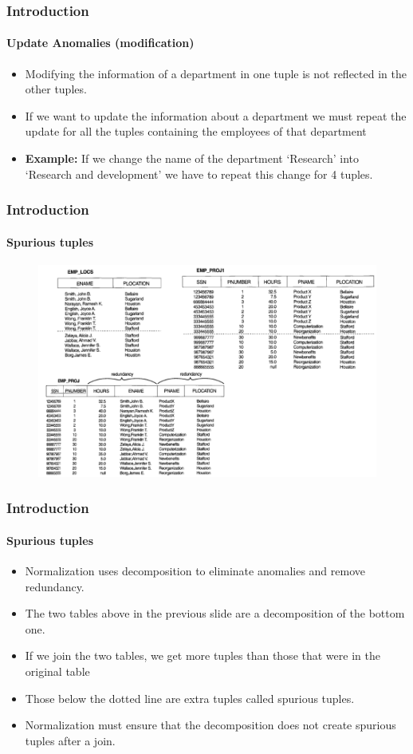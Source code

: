 \documentclass{beamer}
\begin{document}
\begin{frame}
	\frametitle{Introduction}
	\framesubtitle{Update Anomalies (modification)}
	
	\begin{itemize}
		\item Modifying the information of a department in one tuple is not reflected in the other tuples.
		\item If we want to update the information about a department we must repeat the update for all the tuples containing the employees of that department	
		\item \textbf{Example:}  If we change the name of the department ‘Research’ into ‘Research and development’ we have to repeat this change for 4 tuples.			
	\end{itemize}
\end{frame}

\begin{frame}
	\frametitle{Introduction}
	\framesubtitle{Spurious tuples}
	
	\begin{figure}
		\includegraphics[scale=0.4]{img/normalization/norm3}
	\end{figure}
\end{frame}

\begin{frame}
	\frametitle{Introduction}
	\framesubtitle{Spurious tuples}
	
	\begin{itemize}
		\item Normalization uses decomposition to eliminate anomalies and remove redundancy.
		\item The two tables above in the previous slide are a decomposition of the bottom one.
		\item If we join the two tables, we get more tuples than those that were in the original table
		\item Those below the dotted line are extra tuples called spurious tuples.
		\item Normalization must ensure that the decomposition does not create spurious tuples after a join.
	\end{itemize}
\end{frame}
\end{document}
